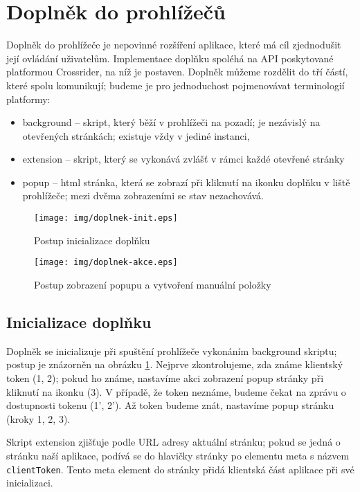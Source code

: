 \section{Doplněk do prohlížečů}

Doplněk do prohlížeče je nepovinné rozšíření aplikace, které má cíl zjednodušit její ovládání uživatelům.
Implementace doplňku spoléhá na API poskytované platformou Crossrider, na níž je postaven.
Doplněk můžeme rozdělit do tří částí, které spolu komunikují; budeme je pro jednoduchost pojmenovávat terminologií platformy:
\begin{itemize}
	\item background -- skript, který běží v prohlížeči na pozadí; je nezávislý na otevřených stránkách; existuje vždy v jediné instanci,
	\item extension -- skript, který se vykonává zvlášť v rámci každé otevřené stránky
	\item popup -- html stránka, která se zobrazí při kliknutí na ikonku doplňku v liště prohlížeče; mezi dvěma zobrazeními se stav nezachovává.
\end{itemize}

\begin{figure}
	\centering
	\texttt{[image: img/doplnek-init.eps]}
	\caption{Postup inicializace doplňku}
	\label{fig:doplnek-init}
\end{figure}
\begin{figure}
	\centering
	\texttt{[image: img/doplnek-akce.eps]}
	\caption{Postup zobrazení popupu a vytvoření manuální položky}
	\label{fig:doplnek-akce}
\end{figure}

\subsection{Inicializace doplňku}

Doplněk se inicializuje při spuštění prohlížeče vykonáním background skriptu; postup je znázorněn na obrázku \ref{fig:doplnek-init}.
Nejprve zkontrolujeme, zda známe klientský token (1, 2); pokud ho známe, nastavíme akci zobrazení popup stránky při kliknutí na ikonku (3).
V případě, že token neznáme, budeme čekat na zprávu o dostupnosti tokenu (1', 2').
Až token budeme znát, nastavíme popup stránku (kroky 1, 2, 3).

Skript extension zjišťuje podle URL adresy aktuální stránku; pokud se jedná o stránku naší aplikace, podívá se do hlavičky stránky po elementu meta s názvem \verb|clientToken|.
Tento meta element do stránky přidá klientská část aplikace při své inicializaci.

